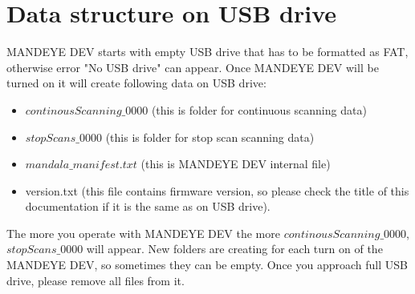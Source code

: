 \section{Data structure on USB drive}
MANDEYE DEV starts with empty USB drive that has to be formatted as FAT, otherwise error "No USB drive" can appear.
Once MANDEYE DEV will be turned on it will create following data on USB drive:
\begin{itemize}
	\item $continousScanning\_0000$ (this is folder for continuous scanning data)
	\item $stopScans\_0000$ (this is folder for stop scan scanning data)
	\item $mandala\_manifest.txt$ (this is MANDEYE DEV internal file)
	\item version.txt (this file contains firmware version, so please check the title of this documentation if it is the same as on USB drive).
\end{itemize}
The more you operate with MANDEYE DEV the more $continousScanning\_0000$, $stopScans\_0000$ will appear. New folders are creating for each turn on of the MANDEYE DEV, so sometimes they can be empty.
Once you approach full USB drive, please remove all files from it.